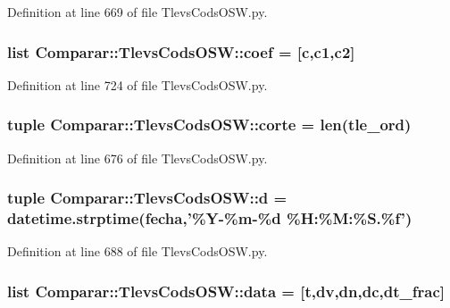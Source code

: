 \-Definition at line 669 of file \-Tlevs\-Cods\-O\-S\-W.\-py.

\subsubsection[{coef}]{\setlength{\rightskip}{0pt plus 5cm}list {\bf \-Comparar\-::\-Tlevs\-Cods\-O\-S\-W\-::coef} = [c,c1,c2]}\label{namespace_comparar_1_1_tlevs_cods_o_s_w_a9ce743d5d29f2b0c385bcf64c39d155e}


\-Definition at line 724 of file \-Tlevs\-Cods\-O\-S\-W.\-py.

\subsubsection[{corte}]{\setlength{\rightskip}{0pt plus 5cm}tuple {\bf \-Comparar\-::\-Tlevs\-Cods\-O\-S\-W\-::corte} = len({\bf tle\-\_\-ord})}\label{namespace_comparar_1_1_tlevs_cods_o_s_w_a1a5c4f744ba44e6e91411b6a1502736b}


\-Definition at line 676 of file \-Tlevs\-Cods\-O\-S\-W.\-py.

\subsubsection[{d}]{\setlength{\rightskip}{0pt plus 5cm}tuple {\bf \-Comparar\-::\-Tlevs\-Cods\-O\-S\-W\-::d} = datetime.\-strptime({\bf fecha},'\%\-Y-\/\%m-\/\%{\bf d} \%\-H\-:\%\-M\-:\%\-S.\%f')}\label{namespace_comparar_1_1_tlevs_cods_o_s_w_a1811fffa84235e16ac8ede40c52ca2ff}


\-Definition at line 688 of file \-Tlevs\-Cods\-O\-S\-W.\-py.

\subsubsection[{data}]{\setlength{\rightskip}{0pt plus 5cm}list {\bf \-Comparar\-::\-Tlevs\-Cods\-O\-S\-W\-::data} = [{\bf t},{\bf dv},{\bf dn},{\bf dc},{\bf dt\-\_\-frac}]}\label{namespace_comparar_1_1_tlevs_cods_o_s_w_a0e4d67c3448069473ffece91e5e422b1}


